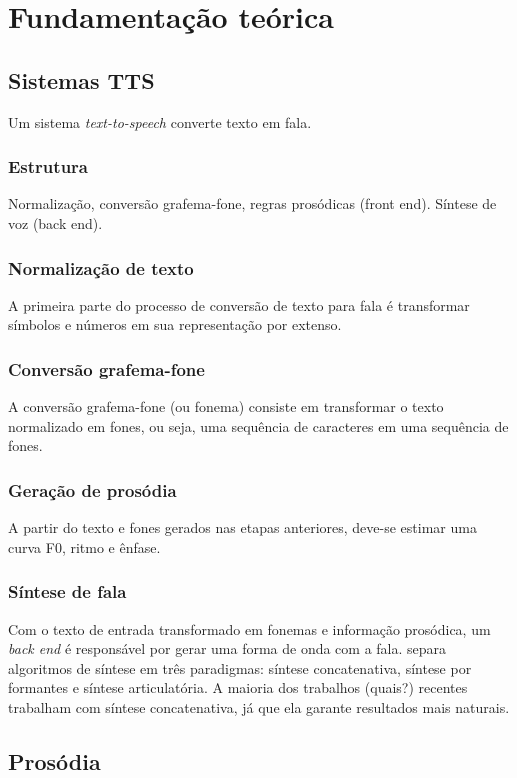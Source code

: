 
\chapter{Fundamentação teórica}
\section{Sistemas TTS}
Um sistema \emph{text-to-speech} converte texto em fala.
\subsection{Estrutura}
Normalização, conversão grafema-fone, regras prosódicas (front end).
Síntese de voz (back end).
\subsection{Normalização de texto}
A primeira parte do processo de conversão de texto para fala é transformar símbolos
e números em sua representação por extenso.
\subsection{Conversão grafema-fone}
A conversão grafema-fone (ou fonema) consiste em transformar o texto normalizado
em fones, ou seja, uma sequência de caracteres em uma sequência de fones.
\subsection{Geração de prosódia}
A partir do texto e fones gerados nas etapas anteriores, deve-se estimar uma
curva F0, ritmo e ênfase.
\subsection{Síntese de fala}
Com o texto de entrada transformado em fonemas e informação prosódica, um
\emph{back end} é responsável por gerar uma forma de onda com a fala.
 separa algoritmos de síntese em três paradigmas:
síntese concatenativa, síntese por formantes e síntese articulatória.
A maioria dos trabalhos (quais?) recentes trabalham com síntese concatenativa,
já que ela garante resultados mais naturais.

\section{Prosódia}
